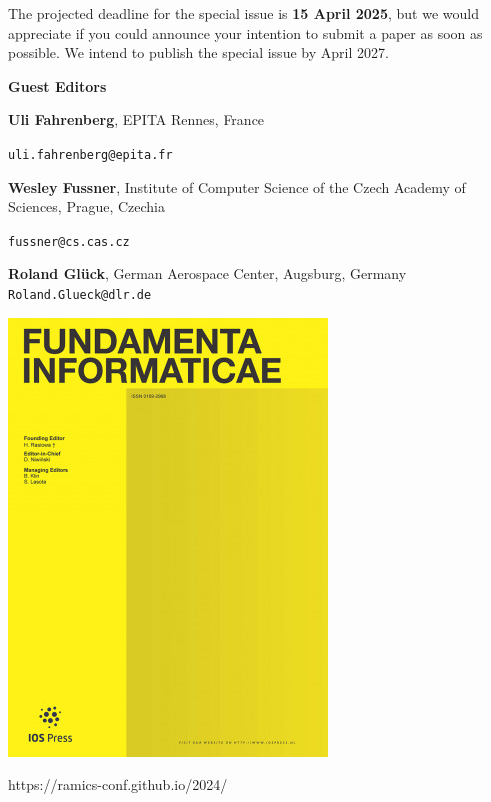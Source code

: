 \documentclass[a4paper, 11pt]{article}
\begin{document}
\begin{multicols}{2}
  The projected deadline for the special issue is \textbf{15 April
    2025}, but we would appreciate if you could announce your
  intention to submit a paper as soon as possible. We intend to
  publish the special issue by April 2027.

  \bigskip
  
  \hfill {\Large \bf Guest Editors}

  \medskip

  \textbf{Uli Fahrenberg}, EPITA Rennes, France

  \hfill \texttt{uli.fahrenberg@epita.fr}
  
  \textbf{Wesley Fussner}, Institute of Computer Science of the Czech
  Academy of Sciences, Prague, Czechia

  \hfill \texttt{fussner@cs.cas.cz}

  \textbf{Roland Glück}, German Aerospace Center, Augsburg, Germany
  \hfill \texttt{Roland.Glueck@dlr.de}

  \bigskip
  \hfill
  \includegraphics[width=.65\linewidth]{fi}
\end{multicols}

\smallskip

\begin{center}
  {\Huge https://ramics-conf.github.io/2024/}
\end{center}


\end{document}

